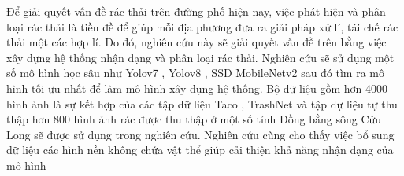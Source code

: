 \documentclass[./thesis.tex]{subfiles}
\begin{document}

{\fontsize{13}{12} \selectfont
Để giải quyết vấn đề rác thải trên đường phố hiện nay, việc phát hiện và phân loại rác thải là tiền đề để giúp mỗi địa phương đưa ra giải pháp xử lí, tái chế rác thải một các hợp lí.
Do đó, nghiên cứu này sẽ giải quyết vấn đề trên bằng việc xây dựng hệ thống nhận dạng và phân loại rác thải. Nghiên cứu sẽ sử dụng một số mô hình học sâu như Yolov7 \cite{wang2022yolov7}, Yolov8 \cite{Yolov8}, SSD MobileNetv2 \cite{Liu_2016} \cite{sandler2019mobilenetv2} sau đó tìm ra mô hình tối ưu nhất để làm mô hình xây dụng hệ thống. Bộ dữ liệu gồm hơn 4000 hình ảnh là sự kết hợp của các tập dữ liệu Taco \cite{proença2020taco}, TrashNet \cite{yang2016classification} và tập dự liệu tự thu thập hơn 800 hình ảnh rác được thu thập ở một số tỉnh Đồng bằng sông Cửu Long sẽ được sử dụng trong nghiên cứu.
Nghiên cứu cũng cho thấy việc bổ sung dữ liệu các hình nền không chứa vật thể giúp cải thiện khả năng nhận dạng của mô hình
}
\bigskip



\end{document}
